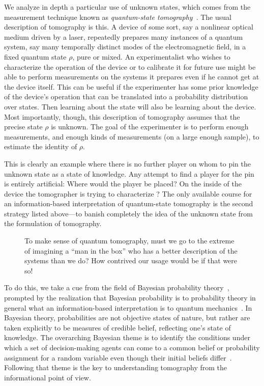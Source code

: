 We analyze in depth a particular use of unknown states, which
comes from the measurement technique known as {\it quantum-state
tomography\/}~\cite{Vogel1989b,Smithey1993,Leonhardt1995}. The
usual description of tomography is this.  A device of some sort,
say a nonlinear optical medium driven by a laser, repeatedly
prepares many instances of a quantum system, say many temporally
distinct modes of the electromagnetic field, in a fixed quantum
state $\rho$, pure or mixed.  An experimentalist who wishes to
characterize the operation of the device or to calibrate it for
future use might be able to perform measurements on the systems it
prepares even if he cannot get at the device itself.  This can be
useful if the experimenter has some prior knowledge of the
device's operation that can be translated into a probability
distribution over states. Then learning about the state will also
be learning about the device.  Most importantly, though, this
description of tomography assumes that the precise state $\rho$ is
unknown.  The goal of the experimenter is to perform enough
measurements, and enough kinds of measurements (on a large enough
sample), to estimate the identity of $\rho$.

This is clearly an example where there is no further player on
whom to pin the unknown state as a state of knowledge.  Any
attempt to find a player for the pin is entirely artificial: Where
would the player be placed?  On the inside of the device the
tomographer is trying to characterize \cite{BerkeleyRhyme}?  The
only available course for an information-based interpretation of
quantum-state tomography is the second strategy listed above---to
banish completely the idea of the unknown state from the formulation
of tomography.

\begin{center}
\begin{figure} \leavevmode
\epsfxsize=9cm  \bigskip\caption{To make sense of
quantum tomography, must we go to the extreme of imagining a ``man
in the box'' who has a better description of the systems than we
do?  How contrived our usage would be if that were so!}
\end{figure}
\end{center}

To do this, we take a cue from the field of Bayesian probability
theory~\cite{Kyburg1980,JaynesPosthumous,Bernardo1994}, prompted
by the realization that Bayesian probability is to probability
theory in general what an information-based interpretation is to
quantum mechanics~\cite{Caves1996,Schack1997}. In Bayesian theory,
probabilities are not objective states of nature, but rather are
taken explicitly to be measures of credible belief, reflecting
one's state of knowledge.  The overarching Bayesian theme is to
identify the conditions under which a set of decision-making
agents can come to a common belief or probability assignment for a
random variable even though their initial beliefs
differ~\cite{Bernardo1994}.  Following that theme is the key to
understanding tomography from the informational point of view.

